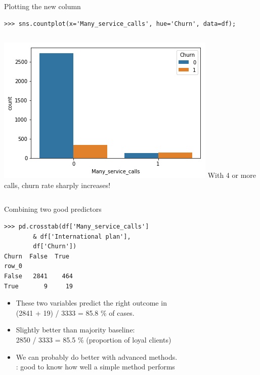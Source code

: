 \documentclass[aspectratio=169,usenames,dvipsnames]{beamer}
\begin{document}
\begin{frame}[fragile]{Plotting the new column}
\begin{lstlisting}
>>> sns.countplot(x='Many_service_calls', hue='Churn', data=df);
\end{lstlisting}

\begin{columns}
\includegraphics[height=0.6\textheight]{fig/telecomplot3}
With 4 or more calls, churn rate sharply increases!
\end{columns}
\end{frame}

\begin{frame}[fragile]{Combining two good predictors}
\begin{lstlisting}
>>> pd.crosstab(df['Many_service_calls']
        & df['International plan'],
        df['Churn'])
Churn  False  True
row_0
False   2841    464
True       9     19
\end{lstlisting}
\begin{itemize}
\item These two variables predict the right outcome in \\
    (2841 + 19) / 3333 = 85.8 \% of cases.
\item Slightly better than majority baseline: \\
    2850 / 3333 = 85.5 \%
    (proportion of loyal clients)
\item We can probably do better with advanced methods. \\
    : good to know how well a simple method performs
\end{itemize}
\end{frame}
\end{document}
